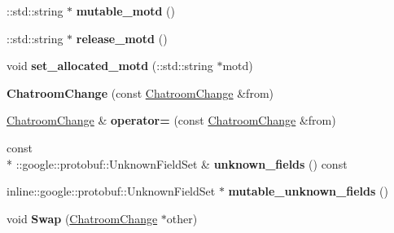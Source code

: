 \begin{DoxyCompactItemize}
\item 
\hypertarget{classSimpleChat_1_1ChatroomChange_a82909be4fb8f30f192b623d0df979799}{\-::std\-::string $\ast$ {\bfseries mutable\-\_\-motd} ()}\label{classSimpleChat_1_1ChatroomChange_a82909be4fb8f30f192b623d0df979799}

\item 
\hypertarget{classSimpleChat_1_1ChatroomChange_a378806ad7c21608d4e349cf3c2ab256f}{\-::std\-::string $\ast$ {\bfseries release\-\_\-motd} ()}\label{classSimpleChat_1_1ChatroomChange_a378806ad7c21608d4e349cf3c2ab256f}

\item 
\hypertarget{classSimpleChat_1_1ChatroomChange_a8241c48fb8cfc701baeb0545bc4701b2}{void {\bfseries set\-\_\-allocated\-\_\-motd} (\-::std\-::string $\ast$motd)}\label{classSimpleChat_1_1ChatroomChange_a8241c48fb8cfc701baeb0545bc4701b2}

\item 
\hypertarget{classSimpleChat_1_1ChatroomChange_abaead93fefe14aa4111dd7e40522ebc9}{{\bfseries Chatroom\-Change} (const \hyperlink{classSimpleChat_1_1ChatroomChange}{Chatroom\-Change} \&from)}\label{classSimpleChat_1_1ChatroomChange_abaead93fefe14aa4111dd7e40522ebc9}

\item 
\hypertarget{classSimpleChat_1_1ChatroomChange_a72f31bff580a7c9362661e5e77ac08ae}{\hyperlink{classSimpleChat_1_1ChatroomChange}{Chatroom\-Change} \& {\bfseries operator=} (const \hyperlink{classSimpleChat_1_1ChatroomChange}{Chatroom\-Change} \&from)}\label{classSimpleChat_1_1ChatroomChange_a72f31bff580a7c9362661e5e77ac08ae}

\item 
\hypertarget{classSimpleChat_1_1ChatroomChange_a0b223a07f61c3e24f31f342e4dd3cba2}{const \\*
\-::google\-::protobuf\-::\-Unknown\-Field\-Set \& {\bfseries unknown\-\_\-fields} () const }\label{classSimpleChat_1_1ChatroomChange_a0b223a07f61c3e24f31f342e4dd3cba2}

\item 
\hypertarget{classSimpleChat_1_1ChatroomChange_a3cd1b332a7d48c4e581efe06596edcb3}{inline\-::google\-::protobuf\-::\-Unknown\-Field\-Set $\ast$ {\bfseries mutable\-\_\-unknown\-\_\-fields} ()}\label{classSimpleChat_1_1ChatroomChange_a3cd1b332a7d48c4e581efe06596edcb3}

\item 
\hypertarget{classSimpleChat_1_1ChatroomChange_a43851d7c9b49cf1e9e9baccba6530b62}{void {\bfseries Swap} (\hyperlink{classSimpleChat_1_1ChatroomChange}{Chatroom\-Change} $\ast$other)}\label{classSimpleChat_1_1ChatroomChange_a43851d7c9b49cf1e9e9baccba6530b62}


\end{DoxyCompactItemize}
